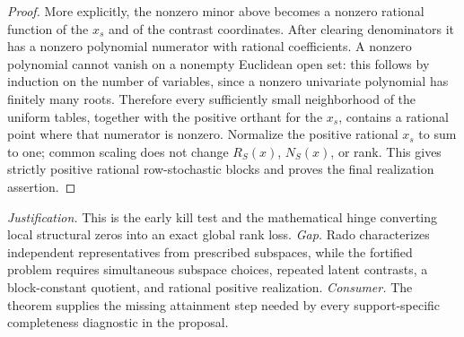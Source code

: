 \documentclass{article}
\begin{document}
\begin{proof}
More explicitly, the nonzero minor above becomes a nonzero rational function of the \(x_s\) and of the contrast coordinates.  After clearing denominators it has a nonzero polynomial numerator with rational coefficients.  A nonzero polynomial cannot vanish on a nonempty Euclidean open set: this follows by induction on the number of variables, since a nonzero univariate polynomial has finitely many roots.  Therefore every sufficiently small neighborhood of the uniform tables, together with the positive orthant for the \(x_s\), contains a rational point where that numerator is nonzero.  Normalize the positive rational \(x_s\) to sum to one; common scaling does not change \(R_S(x)\), \(N_S(x)\), or rank.  This gives strictly positive rational row-stochastic blocks and proves the final realization assertion.
\end{proof}
\par\smallskip\noindent \textit{Justification.} This is the early kill test and the mathematical hinge converting local structural zeros into an exact global rank loss. \textit{Gap.} Rado characterizes independent representatives from prescribed subspaces, while the fortified problem requires simultaneous subspace choices, repeated latent contrasts, a block-constant quotient, and rational positive realization. \textit{Consumer.} The theorem supplies the missing attainment step needed by every support-specific completeness diagnostic in the proposal.
\end{document}
